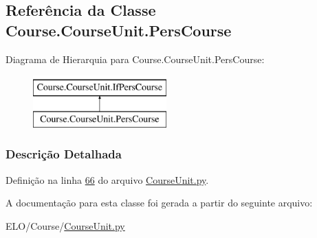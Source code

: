 \hypertarget{classCourse_1_1CourseUnit_1_1PersCourse}{\subsection{Referência da Classe Course.\-Course\-Unit.\-Pers\-Course}
\label{classCourse_1_1CourseUnit_1_1PersCourse}
}
Diagrama de Hierarquia para Course.\-Course\-Unit.\-Pers\-Course\-:\begin{figure}[H]
\begin{center}
\leavevmode
\includegraphics[height=2.000000cm]{d1/d75/classCourse_1_1CourseUnit_1_1PersCourse}
\end{center}
\end{figure}


\subsubsection{Descrição Detalhada}


Definição na linha \hyperlink{CourseUnit_8py_source_l00066}{66} do arquivo \hyperlink{CourseUnit_8py_source}{Course\-Unit.\-py}.



A documentação para esta classe foi gerada a partir do seguinte arquivo\-:\begin{DoxyCompactItemize}
\item 
E\-L\-O/\-Course/\hyperlink{CourseUnit_8py}{Course\-Unit.\-py}\end{DoxyCompactItemize}
